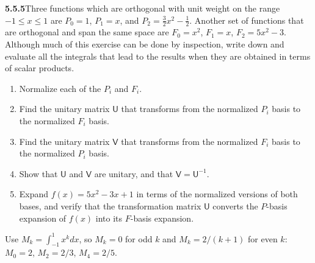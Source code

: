 \par\bigskip
\noindent\textbf{5.5.5}\quad Three functions which are orthogonal with unit
weight on the range $-1\le x\le1$ are $P_{0}=1$, $P_{1}=x$, and
$P_{2}=\frac{3}{2}x^{2}-\frac{1}{2}$. Another set of functions that are
orthogonal and span the same space are $F_{0}=x^{2}$, $F_{1}=x$,
$F_{2}=5x^{2}-3$. Although much of this exercise can be done by inspection,
write down and evaluate all the integrals that lead to the results when they
are obtained in terms of scalar products.
\begin{enumerate}
\item[(a)] Normalize each of the $P_{i}$ and $F_{i}$.
\item[(b)] Find the unitary matrix $\mathsf{U}$ that transforms from the
  normalized $P_{i}$ basis to the normalized $F_{i}$ basis.
\item[(c)] Find the unitary matrix $\mathsf{V}$ that transforms from the
  normalized $F_{i}$ basis to the normalized $P_{i}$ basis.
\item[(d)] Show that $\mathsf{U}$ and $\mathsf{V}$ are unitary, and that
  $\mathsf{V}=\mathsf{U}^{-1}$.
\item[(e)] Expand $f(x)=5x^{2}-3x+1$ in terms of the normalized versions of
  both bases, and verify that the transformation matrix $\mathsf{U}$ converts
  the $P$-basis expansion of $f(x)$ into its $F$-basis expansion.
\end{enumerate}
\solution
Use $M_k=\int_{-1}^1x^kdx$, so $M_k=0$ for odd $k$ and
$M_k=2/(k+1)$ for even $k$: $M_0=2$, $M_2=2/3$, $M_4=2/5$.

